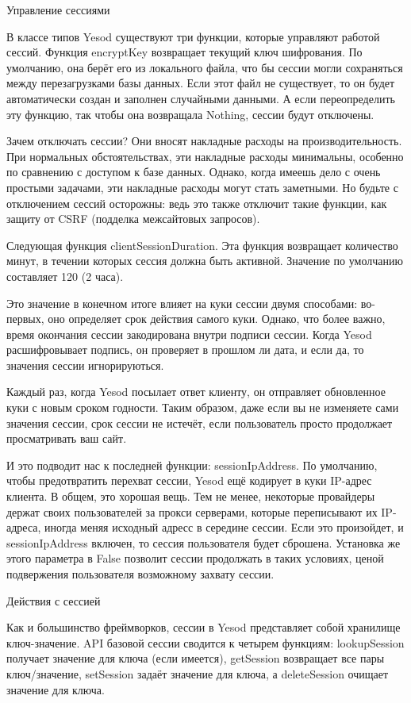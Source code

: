 Управление сессиями

В классе типов Yesod существуют три функции, которые управляют работой
сессий. Функция encryptKey возвращает текущий ключ шифрования. По
умолчанию, она берёт его из локального файла, что бы сессии могли
сохраняться между перезагрузками базы данных. Если этот файл не
существует, то он будет автоматически создан и заполнен случайными
данными. А если переопределить эту функцию, так чтобы она возвращала
Nothing, сессии будут отключены.

Зачем отключать сессии? Они вносят накладные расходы на
производительность. При нормальных обстоятельствах, эти накладные
расходы минимальны, особенно по сравнению с доступом к базе данных.
Однако, когда имеешь дело с очень простыми задачами, эти накладные
расходы могут стать заметными. Но будьте с отключением сессий
осторожны: ведь это также отключит такие функции, как защиту от CSRF
(подделка межсайтовых запросов).

Следующая функция clientSessionDuration. Эта функция возвращает
количество минут, в течении которых сессия должна быть активной.
Значение по умолчанию составляет 120 (2 часа).

Это значение в конечном итоге влияет на куки сессии двумя способами:
во-первых, оно определяет срок действия самого куки. Однако, что более
важно, время окончания сессии закодирована внутри подписи сессии.
Когда Yesod расшифровывает подпись, он проверяет в прошлом ли дата, и
если да, то значения сессии игнорируються.

Каждый раз, когда Yesod посылает ответ клиенту, он отправляет
обновленное куки с новым сроком годности. Таким образом, даже если вы
не изменяете сами значения сессии, срок сессии не истечёт, если
пользователь просто продолжает просматривать ваш сайт.

И это подводит нас к последней функции: sessionIpAddress. По
умолчанию, чтобы предотвратить перехват сессии, Yesod ещё кодирует в
куки IP-адрес клиента. В общем, это хорошая вещь. Тем не менее, 
некоторые провайдеры держат своих пользователей за прокси серверами,
которые переписывают их IP-адреса, иногда меняя исходный адресс в
середине сессии. Если это произойдет, и sessionIpAddress включен, то
сессия пользователя будет сброшена. Установка же этого параметра в False
позволит сессии продолжать в таких условиях, ценой подвержения
пользователя возможному захвату сессии.

Действия с сессией

Как и большинство фреймворков, сессии в Yesod представляет собой
хранилище ключ-значение. API базовой сессии сводится к четырем
функциям: lookupSession получает значение для ключа (если имеется),
getSession возвращает все пары ключ/значение, setSession задаёт
значение для ключа, а deleteSession очищает значение для ключа.

